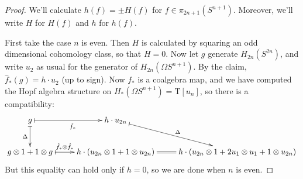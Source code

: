 \documentclass{article}
\theoremstyle{definition}
\begin{document}
\begin{proof}
We'll calculate $h(f)=\pm H(f)$ for $f\in\pi_{2n+1} (S^{n+1})$. Moreover, we'll write $H$ for $H(f)$ and $h$ for $h(f)$.

First take the case $n$ is even.  Then $H$ is calculated by squaring an odd dimensional cohomology class, so that $H = 0$. 
Now let $g$ generate $H_{2n}(S^{2n})$, and write $u_2$ as usual for the generator of $H_{2n}(\Omega S^{n+1})$. By the claim, $\hat f_*(g)=h\cdot u_2$ (up to sign). Now $f_*$ is a coalgebra map, and we have computed the Hopf algebra structure on $H_*(\Omega S^{n+1})=\mathrm{T}[u_n]$, so there is a compatibility:
\[\xymatrix{
g\ar@{|->}[r]_{\hat f_*}\ar@{|->}[d]_{\Delta}&h\cdot u_{2n}\ar@{|->}[dr]^{\Delta}\\
g\otimes1+1\otimes g\ar@{|->}[r]^{\hat f_*\otimes\hat f_*\qquad}&\ar@{=}[r]h\cdot(u_{2n}\otimes1+1\otimes u_{2n})&h\cdot(u_{2n}\otimes1+2u_1\otimes u_1+1\otimes u_{2n})
}\]
But this equality can hold only if $h = 0$, so we are done when $n$ is even.


\end{proof}
\end{document}
